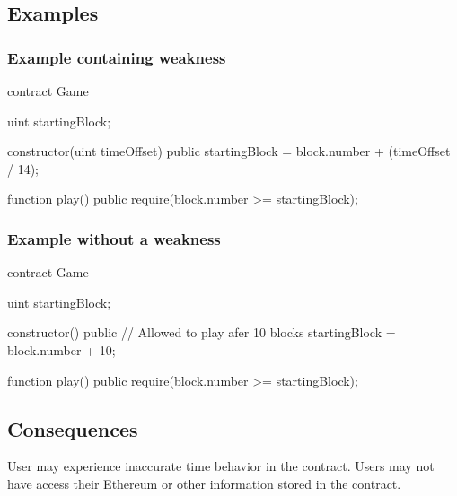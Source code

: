 \subsection{Examples}

\subsubsection{Example containing weakness}
\begin{solidity}
    contract Game {
    	uint startingBlock;

		constructor(uint timeOffset) public {
			startingBlock = block.number + (timeOffset / 14);
		}

		function play() public {
			require(block.number >= startingBlock);
		}
	}
\end{solidity}

\subsubsection{Example without a weakness}
\begin{solidity}
	contract Game {
		uint startingBlock;
	
		constructor() public {
			// Allowed to play afer 10 blocks
			startingBlock = block.number + 10;
		}
	
		function play() public {
			require(block.number >= startingBlock);
		}
	}
\end{solidity}


\subsection{Consequences}
User may experience inaccurate time behavior in the contract.
Users may not have access their Ethereum or other information stored in the contract.
